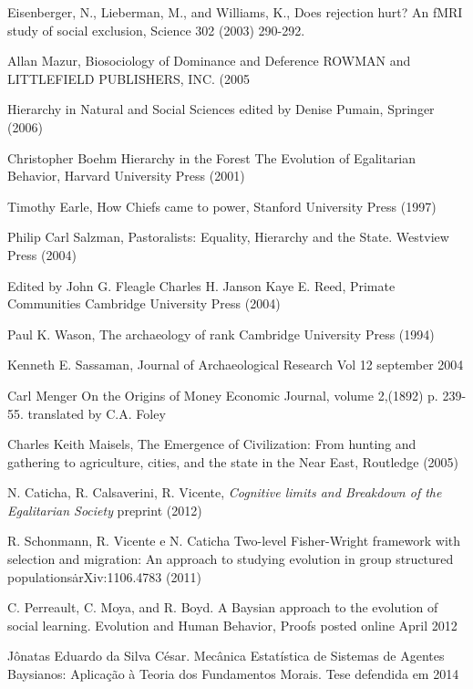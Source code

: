 \documentclass[11pt]{article}
\begin{document}
\begin{thebibliography}{99}
 Eisenberger, N., Lieberman, M., and Williams, K., Does rejection hurt? An fMRI
study of social exclusion, Science 302 (2003) 290-292.

 Allan Mazur,
Biosociology
of Dominance
and Deference
ROWMAN and LITTLEFIELD PUBLISHERS, INC.
(2005

Hierarchy in Natural
and Social Sciences
edited by
Denise Pumain, Springer (2006)

Christopher Boehm
Hierarchy in the Forest
The Evolution of
Egalitarian Behavior, Harvard University Press (2001)

 Timothy Earle,
How Chiefs came to power, Stanford University Press (1997)

 Philip Carl Salzman, Pastoralists: Equality, Hierarchy and
the State. Westview Press (2004)

Edited by
John G. Fleagle
Charles H. Janson
Kaye E. Reed, Primate Communities
Cambridge University Press (2004)

 Paul K. Wason, The archaeology of rank
Cambridge University Press (1994)

 Kenneth E. Sassaman, Journal of Archaeological Research Vol 12 september 2004

 Carl Menger
On the Origins of Money
Economic Journal, volume 2,(1892) p. 239-55.
translated by C.A. Foley

Charles Keith Maisels, The Emergence of
Civilization:
From hunting and gathering to
agriculture, cities, and the state in the
Near East,
Routledge   (2005)

 N. Caticha, R. Calsaverini, R. Vicente, {\it
Cognitive limits and Breakdown of the Egalitarian Society} \/preprint (2012)

 R. Schonmann, R. Vicente e N. Caticha
Two-level Fisher-Wright framework with selection and migration: An approach to
studying evolution in group structured populations\.
arXiv:1106.4783 (2011)

C. Perreault, C. Moya, and R. Boyd. A Baysian approach to the evolution of social learning. Evolution and Human Behavior, Proofs posted online April 2012

Jônatas Eduardo da Silva César. Mecânica Estatística de Sistemas de Agentes
Baysianos: Aplicação à Teoria dos Fundamentos Morais. Tese defendida em 2014


\end{thebibliography}
\end{document}
